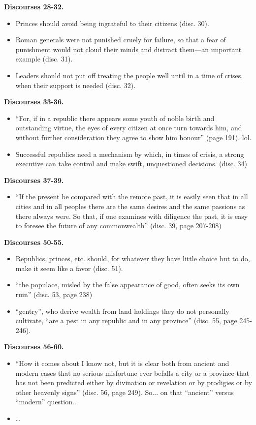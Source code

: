 \documentclass[11pt]{article}
\newcommand{\comment}[1]{{\color{Cerulean}#1}}
\newcommand{\discourses}[1]{{\bfseries Discourses #1.}}
\newcommand{\p}{page }
\renewcommand{\d}{disc. }
\begin{document}
\discourses{28-32}
\begin{itemize}
\item
    Princes should avoid being ingrateful to their citizens (\d 30).
\item
    Roman generals were not punished cruely for failure, so that
    a fear of punishment would not cloud their minds and distract
    them---an important example (\d 31).
\item
    Leaders should not put off treating the people well until
    in a time of crises, when their support is needed (\d 32).
\end{itemize}

\discourses{33-36}
\begin{itemize}
\item
    ``For, if in a republic there appears some youth of noble birth
    and outstanding virtue, the eyes of every citizen at once turn towards
    him, and without further consideration they agree to show him honour''
    (\p 191). lol. 
\item 
    Successful republics need a mechanism by which, in times of crisis,
    a strong executive can take control and make swift, unquestioned 
    decisions. (\d 34)    
\end{itemize}

\discourses{37-39}
\begin{itemize}
\item
    ``If the present be compared with the remote past, it is easily
    seen that in all cities and in all peoples there are the same 
    desires and the same passions as there always were. So that,
    if one examines with diligence the past, it is easy to foresee
    the future of any commonwealth'' (\d 39, \p 207-208) 
\end{itemize}

\discourses{50-55}
\begin{itemize}
\item
    Republics, princes, etc. should, for whatever they have little
    choice but to do, make it seem like a favor (\d 51).
\item
    ``the populace, misled by the false appearance of good, often
    seeks its own ruin'' (\d 53, \p 238)
\item 
    ``gentry'', who derive wealth from land holdings they do not
    personally cultivate, ``are a pest in any republic and in any
    province'' (\d 55, \p 245-246).
\end{itemize}

\discourses{56-60}
\begin{itemize}
\item
    ``How it comes about I know not, but it is clear both from
    ancient and modern cases that no serious misfortune ever
    befalls a city or a province that has not been
    predicted either by divination or revelation or by prodigies 
    or by other heavenly signs'' (\d 56, \p 249).
    \comment{So... on that ``ancient'' versus ``modern''
    question...}
\item 
    \ldots
\end{itemize}
\end{document}
